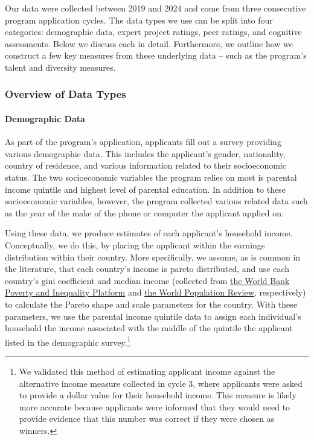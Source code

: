 Our data were collected between 2019 and 2024 and come from three consecutive program application cycles. The data types we use can be split into four categories: demographic data, expert project ratings, peer ratings, and cognitive assessments. Below we discuss each in detail. Furthermore, we outline how we construct a few key measures from these underlying data -- such as the program's talent and diversity measures. 

\subsubsection{Overview of Data Types}

\paragraph{Demographic Data} As part of the program's application, applicants fill out a survey providing various demographic data. This includes the applicant's gender, nationality, country of residence, and various information related to their socioeconomic status. The two socioeconomic variables the program relies on most is parental income quintile and highest level of parental education. In addition to these socioeconomic variables, however, the program collected various related data such as the year of the make of the phone or computer the applicant applied on.

Using these data, we produce estimates of each applicant's household income. Conceptually, we do this, by placing the applicant within the earnings distribution within their country. More specifically, we assume, as is common in the literature, that each country's income is pareto distributed, and use each country's gini coefficient and median income (collected from \hyperlink{https://data.worldbank.org/indicator/SI.POV.GINI}{the World Bank Poverty and Inequality Platform} and \hyperlink{https://worldpopulationreview.com/country-rankings/median-income-by-country}{the World Population Review}, respectively) to calculate the Pareto shape and scale parameters for the country. With these parameters, we use the parental income quintile data to assign each individual's household the income associated with the middle of the quintile the applicant listed in the demographic survey.\footnote{We validated this method of estimating applicant income against the alternative income measure collected in cycle 3, where applicants were asked to provide a dollar value for their household income. This measure is likely more accurate because applicants were informed that they would need to provide evidence that this number was correct if they were chosen as winners.}

